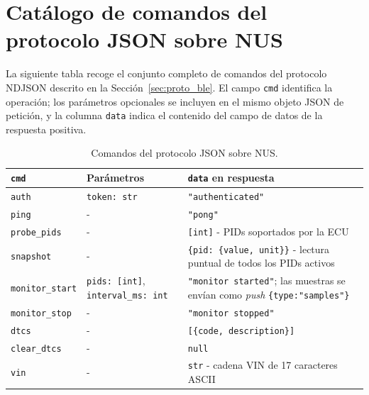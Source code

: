 \chapter{Catálogo de comandos del protocolo JSON sobre NUS}
\label{anx:ble_commands}

La siguiente tabla recoge el conjunto completo de comandos del protocolo NDJSON descrito en la Sección~\ref{sec:proto_ble}. El campo \texttt{cmd} identifica la operación; los parámetros opcionales se incluyen en el mismo objeto JSON de petición, y la columna \texttt{data} indica el contenido del campo de datos de la respuesta positiva.

\begin{table}[H]
\caption{Comandos del protocolo JSON sobre NUS.}
\label{tab:ble_commands}
\centering
\renewcommand{\arraystretch}{1.25}
\begin{tabular}{|l|p{3.8cm}|p{7cm}|}
\hline
\textbf{\texttt{cmd}} & \textbf{Parámetros} & \textbf{\texttt{data} en respuesta} \\
\hline
\texttt{auth}            & \texttt{token: str}                                        & \texttt{"authenticated"} \\
\hline
\texttt{ping}            & -                                                          & \texttt{"pong"} \\
\hline
\texttt{probe\_pids}     & -                                                          & \texttt{[int]} - PIDs soportados por la ECU \\
\hline
\texttt{snapshot}        & -                                                          & \texttt{\{pid: \{value, unit\}\}} - lectura puntual de todos los PIDs activos \\
\hline
\texttt{monitor\_start}  & \texttt{pids: [int]}, \texttt{interval\_ms: int}           & \texttt{"monitor started"}; las muestras se envían como \textit{push} \texttt{\{type:"samples"\}} \\
\hline
\texttt{monitor\_stop}   & -                                                          & \texttt{"monitor stopped"} \\
\hline
\texttt{dtcs}            & -                                                          & \texttt{[\{code, description\}]} \\
\hline
\texttt{clear\_dtcs}     & -                                                          & \texttt{null} \\
\hline
\texttt{vin}             & -                                                          & \texttt{str} - cadena VIN de 17 caracteres ASCII \\

\end{tabular}
\end{table}

